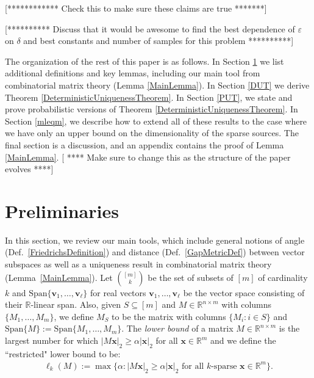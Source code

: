 \documentclass[journal, onecolumn]{IEEEtran}
\begin{document}
[************ Check this to make sure these claims are true *******]




[********** Discuss that it would be awesome to find the best dependence of $\varepsilon$ on $\delta$ and best constants and number of samples for this problem **********]

The organization of the rest of this paper is as follows. In Section \ref{Preliminaries} we list additional definitions and key lemmas, including our main tool from combinatorial matrix theory (Lemma \ref{MainLemma}). In Section \ref{DUT} we derive Theorem \ref{DeterministicUniquenessTheorem}. In Section \ref{PUT}, we state and prove probabilistic versions of Theorem \ref{DeterministicUniquenessTheorem}. In Section \ref{mleqm}, we describe how to extend all of these results to the case where we have only an upper bound on the dimensionality of the sparse sources. The final section is a discussion, and an appendix contains the proof of Lemma \ref{MainLemma}.
[ **** Make sure to change this as the structure of the paper evolves ****]


\section{Preliminaries}\label{Preliminaries}
In this section, we review our main tools, which include general notions of angle (Def.~\ref{FriedrichsDefinition}) and distance (Def.~\ref{GapMetricDef}) between vector subspaces as well as a uniqueness result in combinatorial matrix theory (Lemma~\ref{MainLemma}).
Let ${[m] \choose k}$ be the set of subsets of $[m]$ of cardinality $k$ and $\text{Span}\{\mathbf{v}_1, \ldots, \mathbf{v}_\ell\}$ for real vectors $\mathbf{v}_1, \ldots, \mathbf{v}_\ell$ be the vector space consisting of their $\mathbb{R}$-linear span.
%
%
Also, given $S \subseteq [m]$ and $M \in \mathbb{R}^{n \times m}$ with columns $\{M_1,\ldots,M_m\}$, we define $M_S$ to be the matrix with columns $\{M_i: i \in S\}$ and $\text{Span}\{M\} := \text{Span}\{M_1, \ldots, M_m\}$.  The \emph{lower bound} of a matrix $M \in \mathbb{R}^{n \times m}$ \cite{Grcar10} is the largest number for which $|M\mathbf{x}|_2 \geq \alpha|\mathbf{x}|_2$ for all $\mathbf{x} \in \mathbb{R}^m$ and we define the ``restricted" lower bound to be:
\begin{align}
\ell_k(M) := \max \{ \alpha : |M\mathbf{x}|_2 \geq \alpha|\mathbf{x}|_2 \text{ for all $k$-sparse } \mathbf{x} \in \mathbb{R}^m\}.
\end{align}
\end{document}
